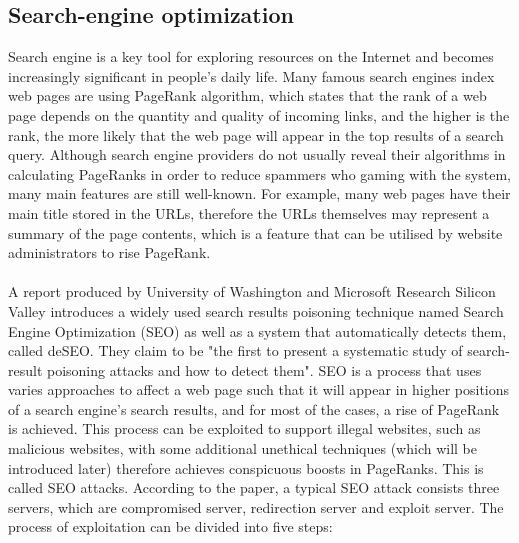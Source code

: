 


\subsection{Search-engine optimization} 

Search engine is a key tool for
exploring resources on the Internet and becomes increasingly significant in
people's daily life. Many famous search engines index web pages are using PageRank
algorithm, which states that the rank of a web page depends on the quantity and
quality of incoming links, and the higher is the rank, the more likely that the
web page will appear in the top results of a search query. Although search
engine providers do not usually reveal their algorithms in calculating
PageRanks in order to reduce spammers who gaming with the system, many main
features are still well-known. For example, many web pages have their main title
stored in the URLs, therefore the URLs themselves may represent a summary of the
page contents, which is a feature that can be utilised by website administrators 
to rise PageRank.
\paragraph{}
A report produced by University of Washington and Microsoft
Research Silicon Valley introduces a widely used search results poisoning
technique named Search Engine Optimization (SEO) as well as a system that
automatically detects them, called deSEO.\cite{deseo} They claim to be "the
first to present a systematic study of search-result poisoning attacks and how
to detect them". SEO is a process that uses varies approaches to affect a web
page such that it will appear in higher positions of a search engine's search
results, and for most of the cases, a rise of PageRank is achieved. This
process can be exploited to support illegal websites, such as malicious
websites, with some additional unethical techniques (which will be introduced
later) therefore achieves conspicuous boosts in PageRanks. This is called SEO
attacks. According to the paper, a typical SEO attack consists three servers,
which are compromised server, redirection server and exploit server. The
process of exploitation can be divided into five steps: 
